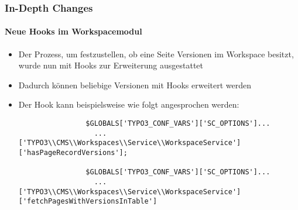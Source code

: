 \begin{frame}[fragile]
	\frametitle{In-Depth Changes}
	\framesubtitle{Neue Hooks im Workspacemodul}

	\lstset{basicstyle=\tiny\ttfamily}

	\begin{itemize}

		\item Der Prozess, um festzustellen, ob eine Seite Versionen im Workspace besitzt, wurde nun mit Hooks zur Erweiterung ausgestattet

		\item Dadurch können beliebige Versionen mit Hooks erweitert werden

		\item Der Hook kann beispielsweise wie folgt angesprochen werden:

			\begin{lstlisting}
				$GLOBALS['TYPO3_CONF_VARS']['SC_OPTIONS']...
				  ...['TYPO3\\CMS\\Workspaces\\Service\\WorkspaceService']['hasPageRecordVersions'];

				$GLOBALS['TYPO3_CONF_VARS']['SC_OPTIONS']...
				  ...['TYPO3\\CMS\\Workspaces\\Service\\WorkspaceService']['fetchPagesWithVersionsInTable']
			\end{lstlisting}

	\end{itemize}

\end{frame}


